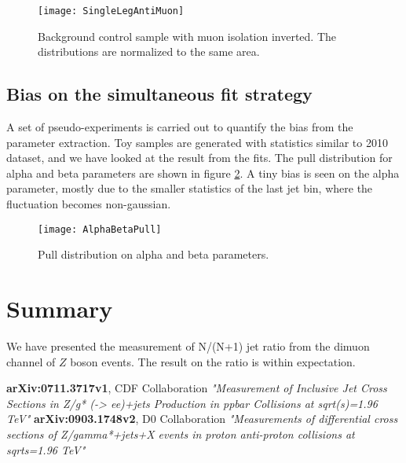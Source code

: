 \documentclass{cmspaper}
\begin{document}
\begin{figure}[hbtp]
\begin{center}
\texttt{[image: SingleLegAntiMuon]}
\caption{Background control sample with muon isolation inverted.  The distributions are normalized to the same area.}
\label{Figure_AntiMuonSingleLeg}
\end{center}
\end{figure}

\subsection{Bias on the simultaneous fit strategy}

A set of pseudo-experiments is carried out to quantify the bias from the parameter extraction.
Toy samples are generated with statistics similar to 2010 dataset, and we have looked at the result from the fits.
The pull distribution for alpha and beta parameters are shown in figure \ref{Figure_AlphaBetaPull}.
A tiny bias is seen on the alpha parameter, mostly due to the smaller statistics of the last jet bin, where the fluctuation becomes non-gaussian.

\begin{figure}[hbtp]
\begin{center}
\texttt{[image: AlphaBetaPull]}
\caption{Pull distribution on alpha and beta parameters.}
\label{Figure_AlphaBetaPull}
\end{center}
\end{figure}





\section{Summary}

We have presented the measurement of N/(N+1) jet ratio from the dimuon
channel of $Z$ boson events.  The result on the ratio is within
expectation.


\begin{thebibliography}{9}
    {\bf arXiv:0711.3717v1},
      CDF Collaboration
      {\em "Measurement of Inclusive Jet Cross Sections in Z/g* (-> ee)+jets Production in ppbar Collisions at sqrt(s)=1.96 TeV"}
    {\bf arXiv:0903.1748v2},
      D0 Collaboration
      {\em "Measurements of differential cross sections of Z/gamma*+jets+X events in proton anti-proton collisions at sqrt{s}=1.96 TeV"}
\end{thebibliography}
 
\pagebreak
\end{document}
